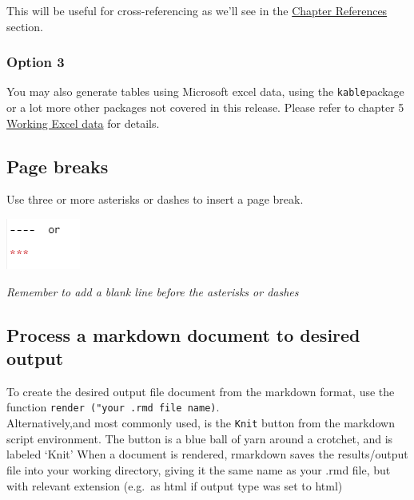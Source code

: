 \documentclass[
]{book}
\let\origfigure\figure
\let\endorigfigure\endfigure
\renewenvironment{figure}[1][2] {
    \expandafter\origfigure\expandafter[H]
} {
    \endorigfigure
}
\begin{document}
This will be useful for cross-referencing as we'll see in the \protect\hyperlink{chapter-references}{Chapter References} section.

\hypertarget{option-3}{%
\subsubsection{Option 3}\label{option-3}}

You may also generate tables using Microsoft excel data, using the \texttt{kable}package or a lot more other packages not covered in this release.
Please refer to chapter 5 \protect\hyperlink{working-excel-data}{Working Excel data} for details.

\hypertarget{page-breaks}{%
\subsection{Page breaks}\label{page-breaks}}

Use three or more asterisks or dashes to insert a page break.

\begin{figure}
\centering
\includegraphics{tutorial_screenshots/page_break.png}
\caption{page break}
\end{figure}

\emph{Remember to add a blank line before the asterisks or dashes}

\hypertarget{process-a-markdown-document-to-desired-output}{%
\subsection{Process a markdown document to desired output}\label{process-a-markdown-document-to-desired-output}}

To create the desired output file document from the markdown format, use the function \texttt{render\ ("your\ .rmd\ file\ name)}.\\
Alternatively,and most commonly used, is the \texttt{Knit} button from the markdown script environment. The button is a blue ball of yarn around a crotchet, and is labeled `Knit'
When a document is rendered, rmarkdown saves the results/output file into your working directory, giving it the same name as your .rmd file, but with relevant extension (e.g.~as html if output type was set to html)
\end{document}
